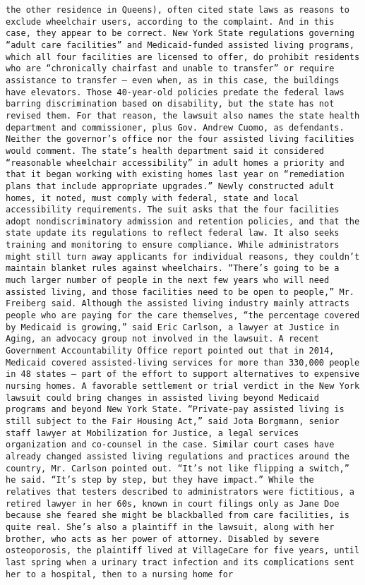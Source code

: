 \documentclass[11pt]{article}
\begin{document}
\begin{Verbatim}[commandchars=\\\{\}]
the other residence in Queens), often cited state laws as reasons to exclude wheelchair users, according to the complaint. And in this case, they appear to be correct. New York State regulations governing “adult care facilities” and Medicaid-funded assisted living programs, which all four facilities are licensed to offer, do prohibit residents who are “chronically chairfast and unable to transfer” or require assistance to transfer — even when, as in this case, the buildings have elevators. Those 40-year-old policies predate the federal laws barring discrimination based on disability, but the state has not revised them. For that reason, the lawsuit also names the state health department and commissioner, plus Gov. Andrew Cuomo, as defendants. Neither the governor’s office nor the four assisted living facilities would comment. The state’s health department said it considered “reasonable wheelchair accessibility” in adult homes a priority and that it began working with existing homes last year on “remediation plans that include appropriate upgrades.” Newly constructed adult homes, it noted, must comply with federal, state and local accessibility requirements. The suit asks that the four facilities adopt nondiscriminatory admission and retention policies, and that the state update its regulations to reflect federal law. It also seeks training and monitoring to ensure compliance. While administrators might still turn away applicants for individual reasons, they couldn’t maintain blanket rules against wheelchairs. “There’s going to be a much larger number of people in the next few years who will need assisted living, and those facilities need to be open to people,” Mr. Freiberg said. Although the assisted living industry mainly attracts people who are paying for the care themselves, “the percentage covered by Medicaid is growing,” said Eric Carlson, a lawyer at Justice in Aging, an advocacy group not involved in the lawsuit. A recent Government Accountability Office report pointed out that in 2014, Medicaid covered assisted-living services for more than 330,000 people in 48 states — part of the effort to support alternatives to expensive nursing homes. A favorable settlement or trial verdict in the New York lawsuit could bring changes in assisted living beyond Medicaid programs and beyond New York State. “Private-pay assisted living is still subject to the Fair Housing Act,” said Jota Borgmann, senior staff lawyer at Mobilization for Justice, a legal services organization and co-counsel in the case. Similar court cases have already changed assisted living regulations and practices around the country, Mr. Carlson pointed out. “It’s not like flipping a switch,” he said. “It’s step by step, but they have impact.” While the relatives that testers described to administrators were fictitious, a retired lawyer in her 60s, known in court filings only as Jane Doe because she feared she might be blackballed from care facilities, is quite real. She’s also a plaintiff in the lawsuit, along with her brother, who acts as her power of attorney. Disabled by severe osteoporosis, the plaintiff lived at VillageCare for five years, until last spring when a urinary tract infection and its complications sent her to a hospital, then to a nursing home for 
\end{Verbatim}
\end{document}
